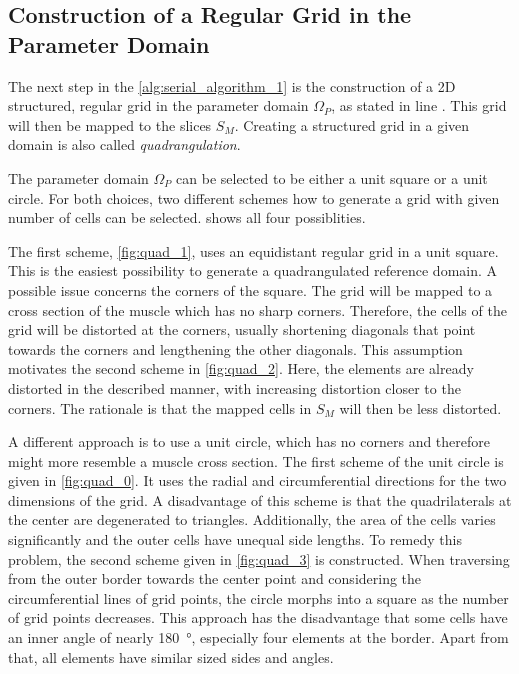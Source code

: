\subsection{Construction of a Regular Grid in the Parameter Domain}
The next step in the \cref{alg:serial_algorithm_1} is the construction of a 2D structured, regular grid in the parameter domain $\Omega_P$, as stated in line . This grid will then be mapped to the slices $S_M$. Creating a structured grid in a given domain is also called \emph{quadrangulation}.

The parameter domain $\Omega_P$ can be selected to be either a unit square or a unit circle. For both choices, two different schemes how to generate a grid with given number of cells can be selected.
 shows all four possiblities.

The first scheme, \cref{fig:quad_1}, uses an equidistant regular grid in a unit square. This is the easiest possibility to generate a quadrangulated reference domain. A possible issue concerns the corners of the square. The grid will be mapped to a cross section of the muscle which has no sharp corners. Therefore, the cells of the grid will be distorted at the corners, usually shortening diagonals that point towards the corners and lengthening the other diagonals. This assumption motivates the second scheme in \cref{fig:quad_2}. Here, the elements are already distorted in the described manner, with increasing distortion closer to the corners. The rationale is that the mapped cells in $S_M$ will then be less distorted.

A different approach is to use a unit circle, which has no corners and therefore might more resemble a muscle cross section. The first scheme of the unit circle is given in \cref{fig:quad_0}. It uses the radial and circumferential directions for the two dimensions of the grid. A disadvantage of this scheme is that the quadrilaterals at the center are degenerated to triangles. Additionally, the area of the cells varies significantly and the outer cells have unequal side lengths. To remedy this problem, the second scheme given in \cref{fig:quad_3} is constructed. When traversing from the outer border towards the center point and considering the circumferential lines of grid points, the circle morphs into a square as the number of grid points decreases. This approach has the disadvantage that some cells have an inner angle of nearly \SI{180}{\degree}, especially four elements at the border. Apart from that, all elements have similar sized sides and angles.

